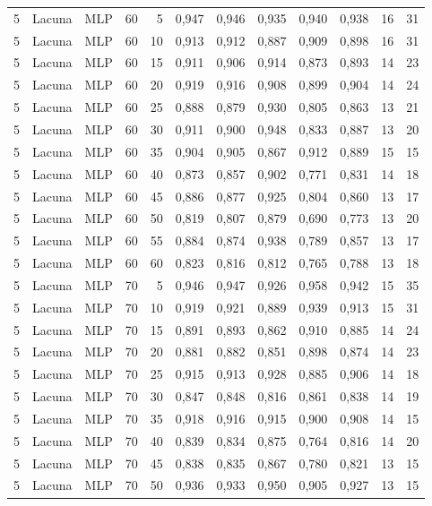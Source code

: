 \begin{longtable}{@{}rllrrrrrrrrr@{}}
5 & Lacuna & MLP & 60 & 5 & 0,947 & 0,946 & 0,935 & 0,940 & 0,938 & 16 & 31 \\
5 & Lacuna & MLP & 60 & 10 & 0,913 & 0,912 & 0,887 & 0,909 & 0,898 & 16 & 31 \\
5 & Lacuna & MLP & 60 & 15 & 0,911 & 0,906 & 0,914 & 0,873 & 0,893 & 14 & 23 \\
5 & Lacuna & MLP & 60 & 20 & 0,919 & 0,916 & 0,908 & 0,899 & 0,904 & 14 & 24 \\
5 & Lacuna & MLP & 60 & 25 & 0,888 & 0,879 & 0,930 & 0,805 & 0,863 & 13 & 21 \\
5 & Lacuna & MLP & 60 & 30 & 0,911 & 0,900 & 0,948 & 0,833 & 0,887 & 13 & 20 \\
5 & Lacuna & MLP & 60 & 35 & 0,904 & 0,905 & 0,867 & 0,912 & 0,889 & 15 & 15 \\
5 & Lacuna & MLP & 60 & 40 & 0,873 & 0,857 & 0,902 & 0,771 & 0,831 & 14 & 18 \\
5 & Lacuna & MLP & 60 & 45 & 0,886 & 0,877 & 0,925 & 0,804 & 0,860 & 13 & 17 \\
5 & Lacuna & MLP & 60 & 50 & 0,819 & 0,807 & 0,879 & 0,690 & 0,773 & 13 & 20 \\
5 & Lacuna & MLP & 60 & 55 & 0,884 & 0,874 & 0,938 & 0,789 & 0,857 & 13 & 17 \\
5 & Lacuna & MLP & 60 & 60 & 0,823 & 0,816 & 0,812 & 0,765 & 0,788 & 13 & 18 \\
5 & Lacuna & MLP & 70 & 5 & 0,946 & 0,947 & 0,926 & 0,958 & 0,942 & 15 & 35 \\
5 & Lacuna & MLP & 70 & 10 & 0,919 & 0,921 & 0,889 & 0,939 & 0,913 & 15 & 31 \\
5 & Lacuna & MLP & 70 & 15 & 0,891 & 0,893 & 0,862 & 0,910 & 0,885 & 14 & 24 \\
5 & Lacuna & MLP & 70 & 20 & 0,881 & 0,882 & 0,851 & 0,898 & 0,874 & 14 & 23 \\
5 & Lacuna & MLP & 70 & 25 & 0,915 & 0,913 & 0,928 & 0,885 & 0,906 & 14 & 18 \\
5 & Lacuna & MLP & 70 & 30 & 0,847 & 0,848 & 0,816 & 0,861 & 0,838 & 14 & 19 \\
5 & Lacuna & MLP & 70 & 35 & 0,918 & 0,916 & 0,915 & 0,900 & 0,908 & 14 & 15 \\
5 & Lacuna & MLP & 70 & 40 & 0,839 & 0,834 & 0,875 & 0,764 & 0,816 & 14 & 20 \\
5 & Lacuna & MLP & 70 & 45 & 0,838 & 0,835 & 0,867 & 0,780 & 0,821 & 13 & 15 \\
5 & Lacuna & MLP & 70 & 50 & 0,936 & 0,933 & 0,950 & 0,905 & 0,927 & 13 & 15 \\

\end{longtable}
